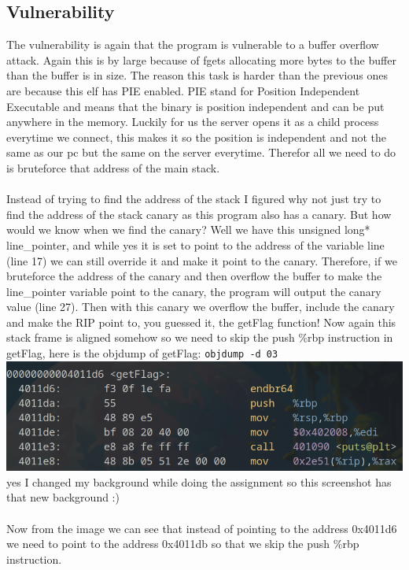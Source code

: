 \documentclass{article}
\begin{document}
\subsection{Vulnerability}
The vulnerability is again that the program is vulnerable to a buffer overflow attack. Again this is by large because of fgets allocating more bytes to the buffer than the buffer is in size. The reason this task is harder than the previous ones are because this elf has PIE enabled. PIE stand for Position Independent Executable and means that the binary is position independent and can be put anywhere in the memory. Luckily for us the server opens it as a child process everytime we connect, this makes it so the position is independent and not the same as our pc but the same on the server everytime. Therefor all we need to do is bruteforce that address of the main stack.
\\ \\
Instead of trying to find the address of the stack I figured why not just try to find the address of the stack canary as this program also has a canary. But how would we know when we find the canary? Well we have this unsigned long* line\_pointer, and while yes it is set to point to the address of the variable line (line 17) we can still override it and make it point to the canary. Therefore, if we bruteforce the address of the canary and then overflow the buffer to make the line\_pointer variable point to the canary, the program will output the canary value (line 27). Then with this canary we overflow the buffer, include the canary and make the RIP point to, you guessed it, the getFlag function! Now again this stack frame is aligned somehow so we need to skip the push \%rbp instruction in getFlag, here is the objdump of getFlag: \lstinline{objdump -d 03} \\
\includegraphics[scale=0.5]{objdump-03.png} \\
yes I changed my background while doing the assignment so this screenshot has that new background :)\\
\\
Now from the image we can see that instead of pointing to the address 0x4011d6 we need to point to the address 0x4011db so that we skip the push \%rbp instruction.
\end{document}
